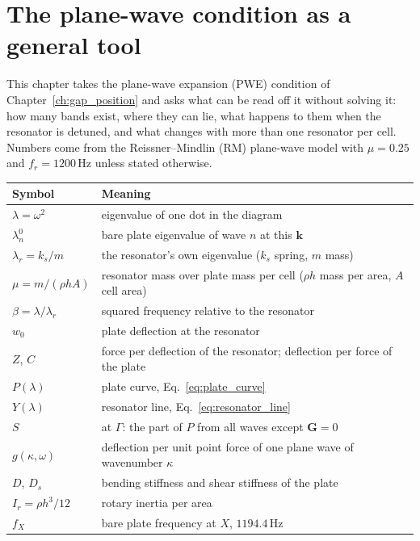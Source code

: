 
\chapter{The plane-wave condition as a general tool}
\label{ch:pwe_general}

This chapter takes the plane-wave expansion (PWE) condition of
Chapter~\ref{ch:gap_position} and asks what can be read off it without solving
it: how many bands exist, where they can lie, what happens to them when the
resonator is detuned, and what changes with more than one resonator per cell.
Numbers come from the Reissner--Mindlin (RM) plane-wave model with $\mu = 0.25$
and $f_r = 1200\,\mathrm{Hz}$ unless stated otherwise.

\begin{center}
\begin{tabular}{|l|p{}|}
\hline
Symbol & Meaning \\
\hline
$\lambda = \omega^2$ & eigenvalue of one dot in the diagram \\
$\lambda_n^0$ & bare plate eigenvalue of wave $n$ at this $\mathbf{k}$ \\
$\lambda_r = k_s/m$ & the resonator's own eigenvalue ($k_s$ spring, $m$ mass) \\
$\mu = m/(\rho h A)$ & resonator mass over plate mass per cell ($\rho h$ mass per area, $A$ cell area) \\
$\beta = \lambda/\lambda_r$ & squared frequency relative to the resonator \\
$w_0$ & plate deflection at the resonator \\
$Z$, $C$ & force per deflection of the resonator; deflection per force of the plate \\
$P(\lambda)$ & plate curve, Eq.~\eqref{eq:plate_curve} \\
$Y(\lambda)$ & resonator line, Eq.~\eqref{eq:resonator_line} \\
$S$ & at $\Gamma$: the part of $P$ from all waves except $\mathbf{G}=0$ \\
$g(\kappa, \omega)$ & deflection per unit point force of one plane wave of wavenumber $\kappa$ \\
$D$, $D_s$ & bending stiffness and shear stiffness of the plate \\
$I_r = \rho h^3/12$ & rotary inertia per area \\
$f_X$ & bare plate frequency at $X$, $1194.4\,\mathrm{Hz}$ \\
\hline
\end{tabular}
\end{center}

